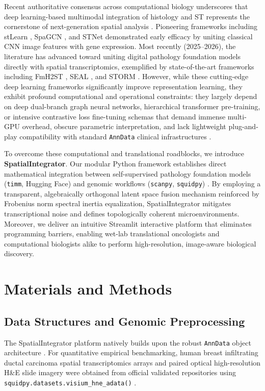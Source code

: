 \documentclass[11pt, a4paper]{article}
\begin{document}
Recent authoritative consensus across computational biology underscores that deep learning-based multimodal integration of histology and ST represents the cornerstone of next-generation spatial analysis \cite{luo2025deep, zhang2024inferring, yang2025staig}. Pioneering frameworks including stLearn \cite{pham2020stlearn}, SpaGCN \cite{hu2021spagcn}, and STNet \cite{he2020integrating} demonstrated early efficacy by uniting classical CNN image features with gene expression. Most recently (2025--2026), the literature has advanced toward uniting digital pathology foundation models directly with spatial transcriptomics, exemplified by state-of-the-art frameworks including FmH2ST \cite{fmh2st2025}, SEAL \cite{seal2026}, and STORM \cite{storm2026}. However, while these cutting-edge deep learning frameworks significantly improve representation learning, they exhibit profound computational and operational constraints: they largely depend on deep dual-branch graph neural networks, hierarchical transformer pre-training, or intensive contrastive loss fine-tuning schemas that demand immense multi-GPU overhead, obscure parametric interpretation, and lack lightweight plug-and-play compatibility with standard \texttt{AnnData} clinical infrastructures \cite{wang2025stimage, fu2024bidcell}.

To overcome these computational and translational roadblocks, we introduce \textbf{SpatialIntegrator}. Our modular Python framework establishes direct mathematical integration between self-supervised pathology foundation models (\texttt{timm}, Hugging Face) \cite{wightman2019pytorch} and genomic workflows (\texttt{scanpy}, \texttt{squidpy}) \cite{wolf2018scanpy, palla2022squidpy}. By employing a transparent, algebraically orthogonal latent space fusion mechanism reinforced by Frobenius norm spectral inertia equalization, SpatialIntegrator mitigates transcriptional noise and defines topologically coherent microenvironments. Moreover, we deliver an intuitive Streamlit interactive platform that eliminates programming barriers, enabling wet-lab translational oncologists and computational biologists alike to perform high-resolution, image-aware biological discovery.

\section{Materials and Methods}

\subsection{Data Structures and Genomic Preprocessing}
The SpatialIntegrator platform natively builds upon the robust \texttt{AnnData} object architecture \cite{wolf2018scanpy}. For quantitative empirical benchmarking, human breast infiltrating ductal carcinoma spatial transcriptomics arrays and paired optical high-resolution H\&E slide imagery were obtained from official validated repositories using \texttt{squidpy.datasets.visium\_hne\_adata()} \cite{palla2022squidpy}.
\end{document}
